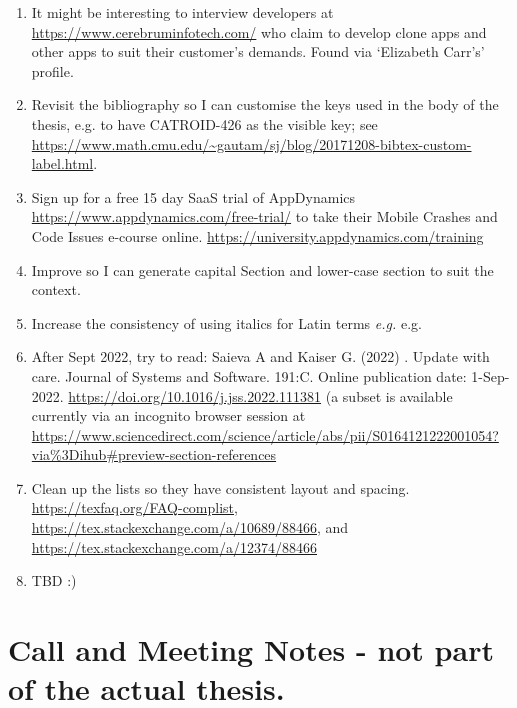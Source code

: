 \begin{enumerate}
    \item It might be interesting to interview developers at \url{https://www.cerebruminfotech.com/} who claim to develop clone apps and other apps to suit their customer's demands. Found via `Elizabeth Carr's' profile. 
    
    \item Revisit the bibliography so I can customise the keys used in the body of the thesis, e.g. to have CATROID-426 as the visible key; see \url{https://www.math.cmu.edu/~gautam/sj/blog/20171208-bibtex-custom-label.html}.
    
    \item Sign up for a free 15 day SaaS trial of AppDynamics \url{https://www.appdynamics.com/free-trial/} to take their Mobile Crashes and Code Issues e-course online. \url{https://university.appdynamics.com/training}
    
    \item Improve  so I can generate capital Section and lower-case section to suit the context.
    
    \item Increase the consistency of using italics for Latin terms \emph{e.g.} e.g.
    
    \item After  Sept 2022, try to read: Saieva A and Kaiser G. (2022) . Update with care. Journal of Systems and Software. 191:C. Online publication date: 1-Sep-2022. \url{https://doi.org/10.1016/j.jss.2022.111381} (a subset is available currently via an incognito browser session at \url{https://www.sciencedirect.com/science/article/abs/pii/S0164121222001054?via\%3Dihub\#preview-section-references}
    
    \item Clean up the lists so they have consistent layout and spacing. \url{https://texfaq.org/FAQ-complist}, \url{https://tex.stackexchange.com/a/10689/88466}, and \url{https://tex.stackexchange.com/a/12374/88466}

    
    \item TBD :)

\end{enumerate}

\clearpage
\section{Call and Meeting Notes - not part of the actual thesis.}


